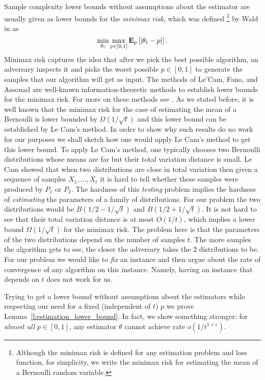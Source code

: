 Sample complexity lower bounds without assumptions about the estimator are usually
given as lower bounds for the \emph{minimax risk}, which was defined
\footnote{
  Although the minimax risk is defined for any estimation problem and loss
  function, for simplicity, we write the minimax risk for estimating the mean
  of a Bernoulli random variable.}
by Wald in \cite{Wal39} as
\[
  \min_{\theta_t} \max_{p\in[0,1]} \bm{\mathrm{E}}_{p} \left[ |\theta_t - p| \right].
\]
\noindent Minimax risk captures the idea that after we pick the best possible
algorithm, an adversary inspects it and picks the worst possible
$p \in[0,1]$ to generate the samples that our algorithm will get as input.
The methods of Le'Cam, Fano, and Assouad are well-known
information-theoretic methods to establish lower bounds for the minimax risk.
For more on these methods see \cite{Yu97,Tsy08}.
As we stated before, it is well known that the minimax risk for the
case of estimating the mean of a Bernoulli is lower bounded by
$\Omega(1/\sqrt{t})$ and this lower bound can be established
by Le Cam's method.
In order to show why such results do no work for our purposes
we shall sketch how one would apply Le Cam's method to get this lower bound.
To apply Le Cam's method, one typically chooses two Bernoulli distributions
whose means are far but their total variation distance is small.
Le Cam showed that when two distributions are close in total variation then
given a sequence of samples $X_1, \ldots, X_t$ it is hard to tell whether
these samples were produced by $P_1$ or $P_2$. The hardness of this \emph{testing}
problem implies the hardness of \emph{estimating} the parameters of
a family of distributions.
For our problem the two distributions would be $B(1/2 - 1/\sqrt{t})$
and $B(1/2 + 1/\sqrt{t})$. It is not hard to see that their total variation
distance is at most $O(1/t)$, which implies a lower bound
$\Omega(1/\sqrt{t})$ for the minimax risk. The problem here is that
the parameters of the two distributions depend on the number of
samples $t$. The more samples the algorithm gets to see, the closer
the adversary takes the $2$ distributions to be.
For our problem we would like to \emph{fix} an instance and then argue
about the rate of convergence of any algorithm on this instance.
Namely, having an instance that depends on $t$ does not work for us.

Trying to get a lower bound without assumptions about the estimators
while respecting our need for a fixed (independent of $t$) $p$ we prove
Lemma~\ref{l:estimation_lower_bound}.
In fact, we show something stronger:
for \emph{almost all} $p \in [0,1]$, any estimator $\theta$ cannot
achieve rate $o(1/t^{1+c})$.
%

